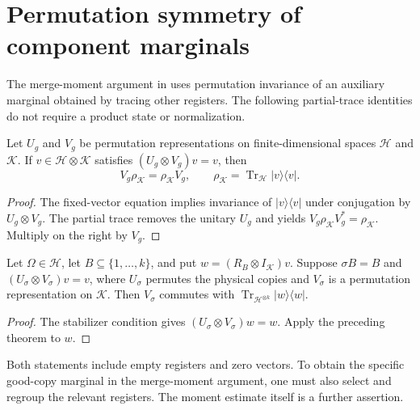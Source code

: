 \section{Permutation symmetry of component marginals}
\label{sec:replica_marginal_symmetry}

The merge-moment argument in \cite[Section~7]{OpenAI2026AreaLaw} uses
permutation invariance of an auxiliary marginal obtained by tracing other
registers. The following partial-trace identities do not require a product
state or normalization.

\begin{theorem}
\label{thm:fixed_vector_marginal_symmetry}
\leanok
Let $U_g$ and $V_g$ be permutation representations on finite-dimensional
spaces $\mathcal H$ and $\mathcal K$. If $v\in\mathcal H\otimes\mathcal K$
satisfies $(U_g\otimes V_g)v=v$, then
\[
 V_g\rho_{\mathcal K}=\rho_{\mathcal K}V_g,
 \qquad \rho_{\mathcal K}=\operatorname{Tr}_{\mathcal H}|v\rangle\langle v|.
\]
\end{theorem}
\begin{proof}
\leanok
The fixed-vector equation implies invariance of $|v\rangle\langle v|$
under conjugation by $U_g\otimes V_g$. The partial trace removes the
unitary $U_g$ and yields $V_g\rho_{\mathcal K}V_g^*=\rho_{\mathcal K}$.
Multiply on the right by $V_g$.
\end{proof}

\begin{theorem}
\label{thm:excitation_component_marginal_symmetry}
\leanok
{}
Let $\Omega\in\mathcal H$, let $B\subseteq\{1,\ldots,k\}$, and put
$w=(R_B\otimes I_{\mathcal K})v$.
Suppose $\sigma B=B$ and $(U_\sigma\otimes V_\sigma)v=v$, where
$U_\sigma$ permutes the physical copies and $V_\sigma$ is a permutation
representation on $\mathcal K$. Then $V_\sigma$ commutes with
$\operatorname{Tr}_{\mathcal H^{\otimes k}}|w\rangle\langle w|$.
\end{theorem}
\begin{proof}
\leanok
{}
The stabilizer condition gives $(U_\sigma\otimes V_\sigma)w=w$.
Apply the preceding theorem to $w$.
\end{proof}

Both statements include empty registers and zero vectors. To obtain the
specific good-copy marginal in the merge-moment argument, one must also
select and regroup the relevant registers. The moment estimate itself is
a further assertion.
